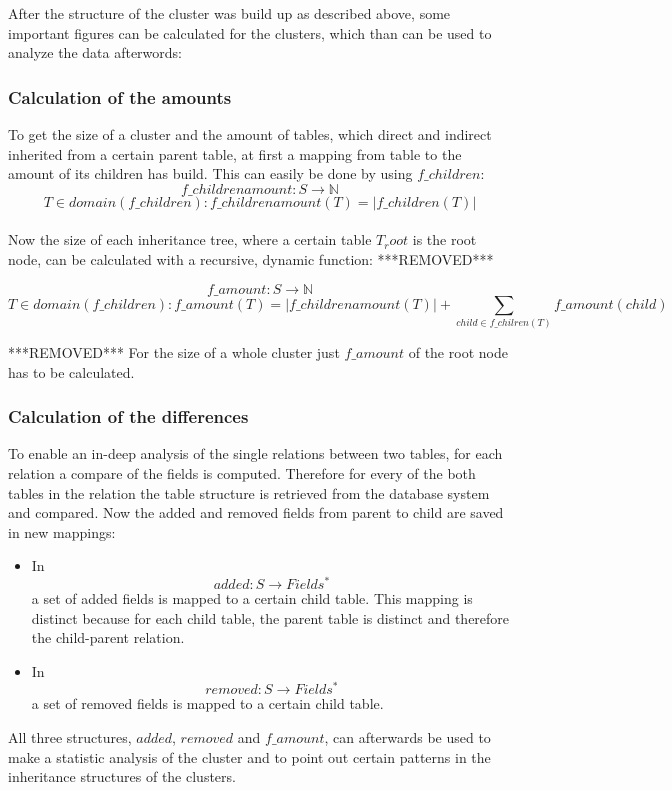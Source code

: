 \documentclass[10pt, journal, twocolumn]{IEEEtran}
\begin{document}
After the structure of the cluster was build up as described above, some important figures can be calculated for the clusters, which than can be used to analyze the data afterwords:
\\\subsubsection{Calculation of the amounts}
To get the size of a cluster and the amount of tables, which direct and indirect inherited from a certain parent table, at first a mapping from table to the amount of its children has build. This can easily be done by using $f\_children$: $$ f\_childrenamount: S \rightarrow \mathbb{N} $$ $$T \in domain(f\_children): f\_childrenamount(T) = | f\_children(T) | $$\\
Now the size of each inheritance tree, where a certain table $T_root$ is the root node, can be calculated with a recursive, dynamic function:
***REMOVED***
\begin{figure*}[h]
\centering
$$ f\_amount: S \rightarrow \mathbb{N} $$ $$T \in domain(f\_children): f\_amount(T) = | f\_childrenamount(T) | + \sum_{child \in f\_chilren(T)}{f\_amount(child)} $$ 
\end{figure*}
***REMOVED***
For the size of a whole cluster just $f\_amount$ of the root node has to be calculated.
\\\subsubsection{Calculation of the differences}
To enable an in-deep analysis of the single relations between two tables, for each relation a compare of the fields is computed. Therefore for every of the both tables in the relation the table structure is retrieved from the database system and compared. Now the added and removed fields from parent to child are saved in new mappings:
\begin{itemize}
\item In $$added: S \rightarrow Fields^*$$ a set of added fields is mapped to a certain child table. This mapping is distinct because for each child table, the parent table is distinct and therefore the child-parent relation.
\item In $$removed: S \rightarrow Fields^*$$ a set of removed fields is mapped to a certain child table. 
\end{itemize}
All three structures, $added$, $removed$ and $f\_amount$, can afterwards be used to make a statistic analysis of the cluster and to point out certain patterns in the inheritance structures of the clusters.
\end{document}

